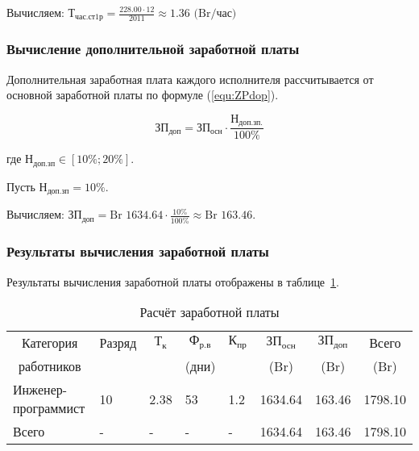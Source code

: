 Вычисляем: $\text{Т}_\text{час.ст1р} = \frac{ 228.00 \cdot 12 }{ 2011 } \approx 1.36 \text{ (Br/час)}$

\subsubsection*{Вычисление дополнительной заработной платы}

Дополнительная заработная плата каждого исполнителя
рассчитывается от основной заработной платы по формуле (\ref{equ:ZPdop}).

\begin{equation}
    \label{equ:ZPdop}
    \text{ЗП}_\text{доп} = \text{ЗП}_\text{осн} \cdot \frac{ \text{Н}_\text{доп.зп.} }{ 100\% }
\end{equation}

где $\text{Н}_\text{доп.зп} \in [10\%; 20\%]$.

Пусть $\text{Н}_\text{доп.зп} = 10\%$.

Вычисляем: $\text{ЗП}_\text{доп} = \text{Br }1634.64 \cdot \frac{ 10\% }{ 100\% } \approx \text{Br } 163.46$.

\subsubsection*{Результаты вычисления заработной платы}

Результаты вычисления заработной платы отображены в таблице~\ref{tab:ZPRezult}.

\begin{table}[ht]
    \centering

    \caption{Расчёт заработной платы}
    \label{tab:ZPRezult}

    \begin{tabular}{|p{4.8cm}|p{1.5cm}|p{1cm}|p{1.5cm}|p{1cm}|p{1.5cm}|p{1.5cm}|p{1.5cm}|}
        \hline
        \multicolumn{1}{|c|}{Категория}
        & \multicolumn{1}{c|}{Разряд}
        & \multicolumn{1}{c|}{$\text{Т}_\text{к}$}
        & \multicolumn{1}{c|}{$\text{Ф}_\text{р.в}$}
        & \multicolumn{1}{c|}{$\text{К}_\text{пр}$}
        & \multicolumn{1}{c|}{$\text{ЗП}_\text{осн}$}
        & \multicolumn{1}{c|}{$\text{ЗП}_\text{доп}$}
        & \multicolumn{1}{c|}{Всего}
        \\
        \multicolumn{1}{|c|}{работников}
        & 
        & 
        & \multicolumn{1}{c|}{(дни)}
        & 
        & \multicolumn{1}{c|}{(Br)}
        & \multicolumn{1}{c|}{(Br)}
        & \multicolumn{1}{c|}{(Br)}
        \\ \hline

        Инженер-программист
        & 10
        & 2.38
        & 53
        & 1.2
        & \multicolumn{1}{r|}{1634.64}
        & \multicolumn{1}{r|}{163.46}
        & \multicolumn{1}{r|}{1798.10}
        \\ \hline

        Всего
        & -
        & -
        & -
        & -
        & \multicolumn{1}{r|}{1634.64}
        & \multicolumn{1}{r|}{163.46}
        & \multicolumn{1}{r|}{1798.10}
        \\ \hline
    \end{tabular}
\end{table}

